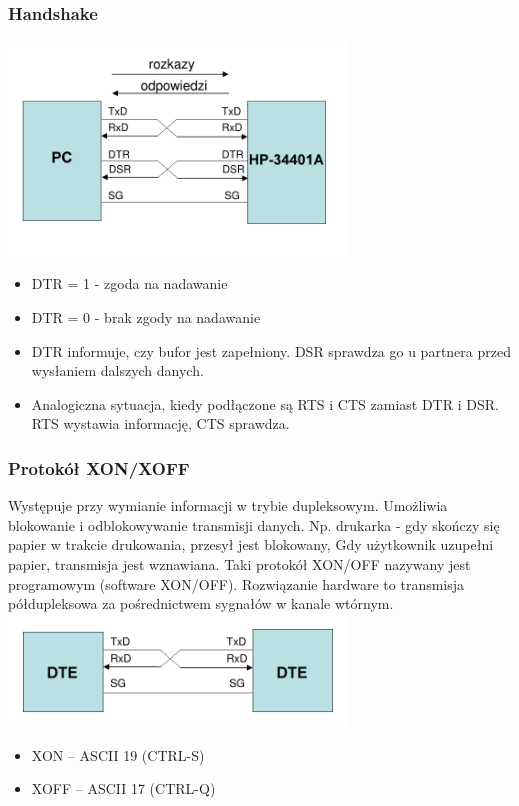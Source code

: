 \documentclass[a4paper,twoside]{article}
\begin{document}
		\subsubsection{Handshake}
		\includegraphics[width=9cm]{./wyklady/RS232_9_1.pdf}
		\begin{itemize}
			\item DTR = 1 - zgoda na nadawanie
			\item DTR = 0 - brak zgody na nadawanie
			\item DTR informuje, czy bufor jest zapełniony. DSR sprawdza go u partnera przed wysłaniem dalszych danych.
			\item Analogiczna sytuacja, kiedy podłączone są RTS i CTS zamiast DTR i DSR. RTS wystawia informację, CTS sprawdza.
		\end{itemize}
		\subsubsection{Protokół XON/XOFF}
		Występuje przy wymianie informacji w trybie dupleksowym. Umożliwia blokowanie i odblokowywanie transmisji danych. Np. drukarka - gdy skończy się papier w trakcie drukowania, przesył jest blokowany, Gdy użytkownik uzupełni papier, transmisja jest wznawiana. Taki protokół XON/OFF nazywany jest programowym (software XON/OFF). {\small Rozwiązanie hardware to transmisja półdupleksowa za pośrednictwem sygnałów w kanale wtórnym.}\\
		\includegraphics[width=9cm]{./wyklady/RS232_9_2.pdf}
		\begin{itemize}
			\item XON – ASCII 19 (CTRL-S)
			\item XOFF – ASCII 17 (CTRL-Q)
		\end{itemize}
\end{document}
